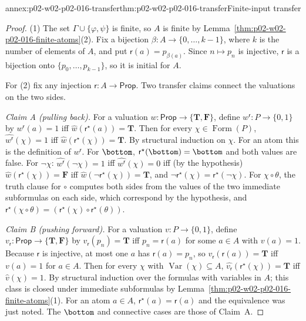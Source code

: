\begin{annexitem}{annex:p02-w02-p02-016-transfer}{thm:p02-w02-p02-016-transfer}{Finite-input transfer}
\begin{proof}
(1) The set \(\Gamma\cup\{\varphi,\psi\}\) is finite, so \(A\) is finite by
Lemma~\ref{thm:p02-w02-p02-016-finite-atoms}(2).  Fix a bijection
\(\beta:A\to\{0,\ldots,k-1\}\), where \(k\) is the number of elements of
\(A\), and put \(\mathsf r(a)=p_{\beta(a)}\).  Since \(n\mapsto p_n\) is injective,
\(\mathsf r\) is a bijection onto \(\{p_0,\ldots,p_{k-1}\}\), so it is initial
for \(A\).

For (2) fix any injection \(\mathsf r:A\to\mathsf{Prop}\).  Two transfer claims
connect the valuations on the two sides.

\emph{Claim A (pulling back).}  For a valuation
\(w:\mathsf{Prop}\to\{\mathbf T,\mathbf F\}\), define
\(w^{\mathsf r}:P\to\{0,1\}\) by \(w^{\mathsf r}(a)=1\) iff
\(\widehat w(\mathsf r^{\star}(a))=\mathbf T\).  Then for every
\(\chi\in\operatorname{Form}(P)\),
\(\widehat{w^{\mathsf r}}(\chi)=1\) iff \(\widehat w(\mathsf r^{\star}(\chi))=\mathbf T\).
By structural induction on \(\chi\).  For an atom this is the definition of
\(w^{\mathsf r}\).  For \(\bottom\), \(\mathsf r^{\star}(\bottom)=\bottom\) and both
values are false.  For \(\neg\chi\):
\(\widehat{w^{\mathsf r}}(\neg\chi)=1\) iff \(\widehat{w^{\mathsf r}}(\chi)=0\) iff (by
the hypothesis) \(\widehat w(\mathsf r^{\star}(\chi))=\mathbf F\) iff
\(\widehat w(\neg\mathsf r^{\star}(\chi))=\mathbf T\), and
\(\neg\mathsf r^{\star}(\chi)=\mathsf r^{\star}(\neg\chi)\).  For \(\chi\circ\theta\),
the truth clause for \(\circ\) computes both sides from the values of the two
immediate subformulas on each side, which correspond by the hypothesis, and
\(\mathsf r^{\star}(\chi\circ\theta)=(\mathsf r^{\star}(\chi)\circ\mathsf r^{\star}(\theta))\).

\emph{Claim B (pushing forward).}  For a valuation \(v:P\to\{0,1\}\), define
\(v_{\mathsf r}:\mathsf{Prop}\to\{\mathbf T,\mathbf F\}\) by
\(v_{\mathsf r}(p_n)=\mathbf T\) iff \(p_n=\mathsf r(a)\) for some \(a\in A\) with
\(v(a)=1\).  Because \(\mathsf r\) is injective, at most one \(a\) has
\(\mathsf r(a)=p_n\), so \(v_{\mathsf r}(\mathsf r(a))=\mathbf T\) iff \(v(a)=1\) for
\(a\in A\).  Then for every \(\chi\) with
\(\operatorname{Var}(\chi)\subseteq A\),
\(\widehat{v_{\mathsf r}}(\mathsf r^{\star}(\chi))=\mathbf T\) iff
\(\widehat v(\chi)=1\).  By structural induction over the formulas with
variables in \(A\); this class is closed under immediate subformulas by
Lemma~\ref{thm:p02-w02-p02-016-finite-atoms}(1).  For an atom \(a\in A\),
\(\mathsf r^{\star}(a)=\mathsf r(a)\) and the equivalence was just noted.  The
\(\bottom\) and connective cases are those of Claim~A.


\end{proof}
\end{annexitem}
